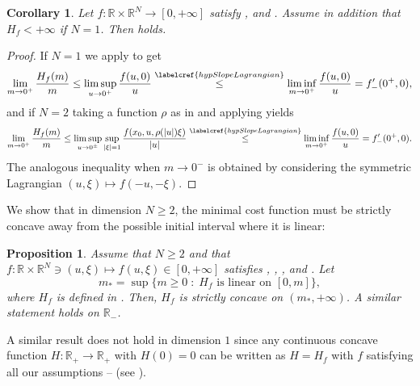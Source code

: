 \documentclass[JEP,XML,SOM,Unicode,published]{cedram}
\theoremstyle{plain}
\newtheorem{proposition}[theorem]{Proposition}
\newtheorem{corollary}[theorem]{Corollary}
\theoremstyle{definition}
\newcommand{\R}{\mathbb{R}}
\newcommand{\st}{\;:\;}
\DeclarePairedDelimiter{\abs}{\lvert}{\rvert}
\begin{document}
\begin{corollary}\label{slopeConditionCorollary}
Let $f : \R \times \R^N \to [0,+\infty]$ satisfy ,  and . Assume in addition that $H_f<+\infty$ if $N=1$. Then  holds.
\end{corollary}
\begin{proof}
If $N=1$ we apply  to get
\[\lim_{m\to 0^+} \frac{H_f(m)} m \leq \limsup_{u\to 0^+} \frac{f(u,0)}u \overset{\labelcref{hypSlopeLagrangian}}{\leq} \liminf_{m\to 0^+} \frac{f(u,0)}u = f'_-(0^+,0),\]
and if $N=2$ taking a function $\rho$ as in  and applying  yields
\[\lim_{m\to 0^+} \frac{H_f(m)} m \leq \limsup_{u\to 0^\pm}\sup_{\abs{\xi}= 1}\frac{f(x_0,u,\rho(\abs{u})\xi)}{\abs{u}} \overset{\labelcref{hypSlopeLagrangian}}{\leq} \liminf_{m\to 0^+} \frac{f(u,0)}u = f'_-(0^+,0).\]
The analogous inequality when $m\to 0^-$ is obtained by considering the symmetric Lagrangian $(u,\xi) \mapsto f(-u,-\xi)$.
\end{proof}


We show that in dimension \(N\geq 2\), the minimal cost function must be strictly concave away from the possible initial interval where it is linear:
\begin{proposition}\label{propositionStricConcave}
Assume that \(N\geq 2\) and that $f :\R\times\R^N\ni (u,\xi) \mapsto f(u,\xi)\in [0,+\infty]$ satisfies , , ,  and . Let
\[
m_\ast=\sup\{m\geq 0\st \text{\(H_f\) is linear on \([0,m]\)}\},
\]
where \(H_f\) is defined in . Then, \(H_f\) is strictly concave on \((m_\ast,+\infty)\). A similar statement holds on $\R_-$.
\end{proposition}
A similar result does not hold in dimension \(1\) since any continuous concave function \(H:\R_+\to\R_+\) with \(H(0)=0\) can be written as \(H=H_f\) with \(f\) satisfying all our assumptions -- (see ).
\end{document}
